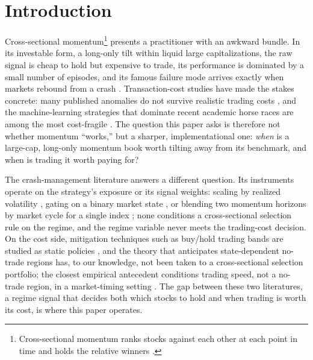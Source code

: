 
\clearpage
\section{Introduction}\label{sec:introduction}

Cross-sectional momentum\footnote{Cross-sectional momentum ranks stocks against each other at each point in time and holds the relative winners \citep{JegadeeshTitman1993}.} presents a practitioner with an awkward bundle. In its investable form, a long-only tilt within liquid large capitalizations, the raw signal is cheap to hold but expensive to trade, its performance is dominated by a small number of episodes, and its famous failure mode arrives exactly when markets rebound from a crash \citep{DanielMoskowitz2016}. Transaction-cost studies have made the stakes concrete: many published anomalies do not survive realistic trading costs \citep{NovyMarxVelikov2016, DetzelNovyMarxVelikov2023}, and the machine-learning strategies that dominate recent academic horse races are among the most cost-fragile \citep{AzevedoHoegnerVelikov2024}. The question this paper asks is therefore not whether momentum ``works,'' but a sharper, implementational one: \emph{when} is a large-cap, long-only momentum book worth tilting away from its benchmark, and when is trading it worth paying for?

The crash-management literature answers a different question. Its instruments operate on the strategy's exposure or its signal weights: scaling by realized volatility \citep{BarrosoSantaClara2015, MoreiraMuir2017}, gating on a binary market state \citep{Cooper2004}, or blending two momentum horizons by market cycle for a single index \citep{GHM2023}; none conditions a cross-sectional selection rule on the regime, and the regime variable never meets the trading-cost decision. On the cost side, mitigation techniques such as buy/hold trading bands are studied as static policies \citep{NovyMarxVelikov2016, NovyMarxVelikov2019}, and the theory that anticipates state-dependent no-trade regions \citep{Jang2007, LynchTan2011} has, to our knowledge, not been taken to a cross-sectional selection portfolio; the closest empirical antecedent conditions trading speed, not a no-trade region, in a market-timing setting \citep{CollinDufresne2020}. The gap between these two literatures, a regime signal that decides both which stocks to hold and when trading is worth its cost, is where this paper operates.

